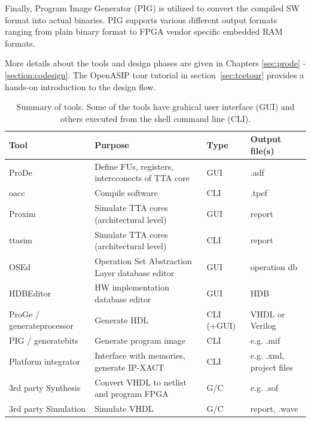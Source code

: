 \documentclass[a4paper,twoside]{tceusermanual}
\begin{document}
Finally, Program Image Generator (PIG) is utilized to convert the 
compiled SW format into actual binaries. PIG supports various
different output formats ranging from plain binary format to FPGA
vendor specific embedded RAM formats.

More details about the tools and design phases are given in Chapters
\ref{sec:prode} - \ref{section:codesign}. The OpenASIP tour tutorial in
section~\ref{sec:tcetour} provides a hands-on introduction to the design
flow.

\begin{table}
  \begin{center}
    \caption {Summary of tools. Some of the tools have grahical
    user interface (GUI) and others executed from the shell command
    line (CLI).}
    \label {tab:phases}
    \begin{tabular}{l | l | l | l }
      \hline
      Tool & Purpose & Type & Output file(s)\\
      \hline
      \hline
      ProDe                & Define FUs, registers, intercconects of TTA core & GUI  & .adf \\
      oacc                 & Compile software                                 & CLI  & .tpef \\
      Proxim               & Simulate TTA cores (architectural level)         & GUI  & report \\
      ttasim               & Simulate TTA cores (architectural level)         & CLI  & report \\
      OSEd                 & Operation Set Abstraction Layer database editor  & GUI  & operation db \\
      HDBEditor            & HW implementation database editor                & GUI  & HDB  \\
      \hline
      ProGe / generateprocessor             & Generate HDL                    & CLI (+GUI) & VHDL or Verilog \\
      PIG / generatebits   & Generate program image                           & CLI  & e.g. .mif  \\
      Platform integrator  & Interface with memories, generate IP-XACT        & CLI  & e.g. .xml, project files \\
      \hline
      3rd party Synthesis  & Convert VHDL to netlist and program FPGA         & G/C  &  e.g. .sof\\
      3rd party Simulation & Simulate VHDL                                    & G/C  &  report, .wave \\
      \hline
    \end{tabular}
  \end{center}
\end{table}
\end{document}
